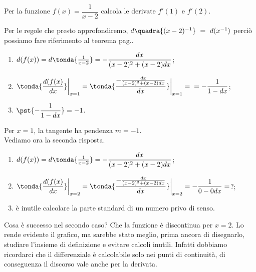 \begin{esempio}
 Per la funzione $f(x)=\dfrac{1}{x-2}$ calcola le derivate $f'(1)$ e $f'(2)$.\\
\begin{inaccessibleblock}
 \begin{center}
 \begin{minipage}[]{.40 \textwidth}
   \vspace{-.5em}
  \derivaomografica
 \end{minipage} 
 \hfill
 \begin{minipage}[]{.58 \textwidth}
   Per le regole che presto approfondiremo, $d\quadra{(x-2)^{-1}}~=~d(x^{-1})$
   perciò possiamo fare riferimento al teorema pag.\pageref{subsubsec:diff01_diffrecip}.
\begin{enumerate} [noitemsep]
 \item $d(f(x))=d\tonda {\frac{1}{x-2}}=-\dfrac{dx}{(x-2)^2+(x-2)dx}$;
 \item $\tonda{\dfrac{d(f(x)}{dx}}\bigg|_{x=1}=
  \tonda{\dfrac{-\frac{dx}{(x-2)^2+(x-2)dx}}{dx}}\bigg|_{x=1}=\\ 
  =-\dfrac{1}{1-dx}$;
  \item $\pst{-\dfrac{1}{1-dx}}=-1$.
\end{enumerate}
\end{minipage}
\end{center}
\end{inaccessibleblock}
\label{}

Per $x=1$, la tangente ha pendenza $m=-1$.\\
Vediamo ora la seconda risposta.
\begin{enumerate} [noitemsep]
 \item $d(f(x))=d\tonda {\frac{1}{x-2}}=-\dfrac{dx}{(x-2)^2+(x-2)dx}$;
 \item $\tonda{\dfrac{d(f(x)}{dx}}\bigg|_{x=2}=
  \tonda{\dfrac{-\frac{dx}{(x-2)^2+(x-2)dx}}{dx}}\bigg|_{x=2} 
  =-\dfrac{1}{0-0dx}=$?;
  \item è inutile calcolare la parte standard di un numero privo di senso.
\end{enumerate}
Cosa è successo nel secondo caso? Che la funzione è discontinua per $x=2$.
Lo rende evidente il grafico, ma sarebbe stato meglio, prima ancora di
disegnarlo, studiare l'insieme di definizione e evitare calcoli inutili.
Infatti dobbiamo ricordarci che il differenziale è calcolabile solo nei punti
di continuità, di conseguenza il discorso vale anche per la derivata.
\end{esempio}

